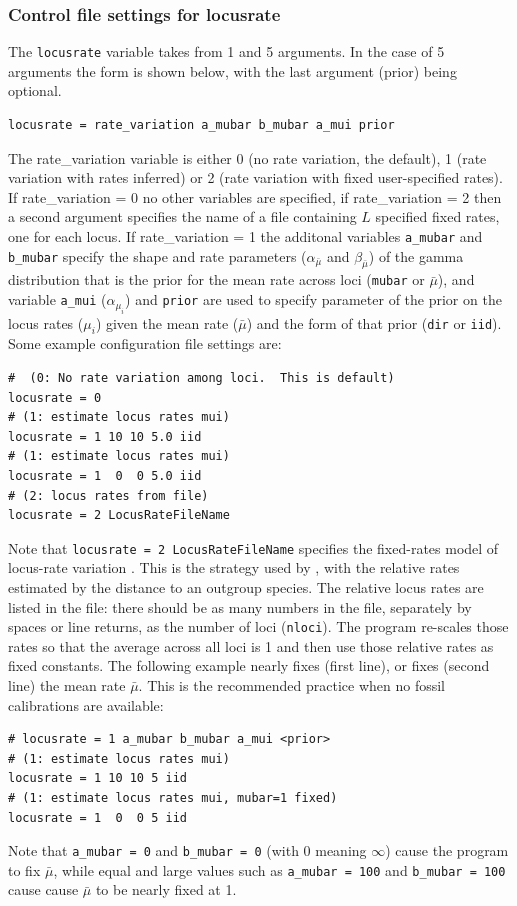 \documentclass{book}
\numberwithin{equation}{section} \renewcommand{\baselinestretch}{0.55}
\begin{document}
\subsubsection{Control file settings for locusrate}
The \texttt{locusrate} variable takes from 1 and 5 arguments. In the
case of 5 arguments the form is shown below, with the last argument
(prior) being optional.
\begin{verbatim}
locusrate = rate_variation a_mubar b_mubar a_mui prior 
\end{verbatim}
The rate\_variation variable is either 0 (no rate variation, the
default), 1 (rate variation with rates inferred) or 2 (rate variation
with fixed user-specified rates).  If rate\_variation = 0 no other
variables are specified, if rate\_variation = 2 then a second argument
specifies the name of a file containing $L$ specified fixed rates, one
for each locus. If rate\_variation = 1 the additonal variables
\texttt{a\_mubar} and \texttt{b\_mubar} specify the shape and rate
parameters ($\alpha_{\bar{\mu}}$ and $\beta_{\bar{\mu}}$) of the gamma
distribution that is the prior for the mean rate across loci
(\texttt{mubar} or $\bar\mu$), and variable \texttt{a\_mui}
($\alpha_{\mu_i}$) and \texttt{prior} are used to specify parameter of
the prior on the locus rates ($\mu_i$) given the mean rate ($\bar\mu$)
and the form of that prior (\texttt{dir} or \texttt{iid}).  Some
example configuration file settings are:
\begin{verbatim}
#  (0: No rate variation among loci.  This is default)
locusrate = 0
# (1: estimate locus rates mui)
locusrate = 1 10 10 5.0 iid
# (1: estimate locus rates mui)
locusrate = 1  0  0 5.0 iid
# (2: locus rates from file)
locusrate = 2 LocusRateFileName    
\end{verbatim}
Note that \texttt{locusrate = 2 LocusRateFileName} specifies the
fixed-rates model of locus-rate variation \citep{Burgess2008}.  This
is the strategy used by \citet{Yang2002}, with the relative rates
estimated by the distance to an outgroup species.  The relative locus
rates are listed in the file: there should be as many numbers in the
file, separately by spaces or line returns, as the number of loci
(\texttt{nloci}).  The program re-scales those rates so that the
average across all loci is 1 and then use those relative rates as
fixed constants.  The following example nearly fixes (first line), or
fixes (second line) the mean rate $\bar{\mu}$.  This is the
recommended practice when no fossil calibrations are available:
\begin{verbatim}
# locusrate = 1 a_mubar b_mubar a_mui <prior>
# (1: estimate locus rates mui)
locusrate = 1 10 10 5 iid
# (1: estimate locus rates mui, mubar=1 fixed)
locusrate = 1  0  0 5 iid      
\end{verbatim}
Note that \texttt{a\_mubar = 0} and \texttt{b\_mubar = 0} (with 0
meaning $\infty$) cause the program to fix $\bar{\mu}$, while equal
and large values such as \texttt{a\_mubar = 100} and \texttt{b\_mubar
  = 100} cause cause $\bar\mu$ to be nearly fixed at 1.
\end{document}
